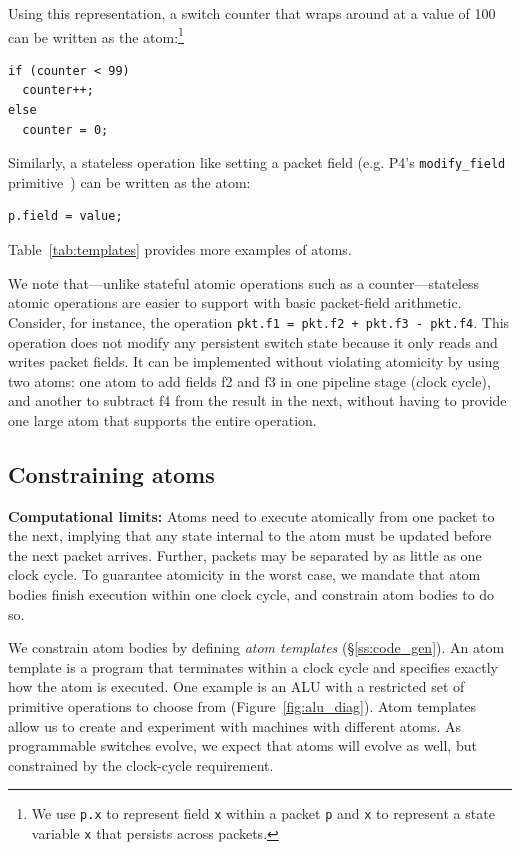 Using this representation, a switch counter that wraps around at a
value of 100 can be written as the atom:\footnote{We use {\tt p.x} to
  represent field {\tt x} within a packet {\tt p} and {\tt x} to
  represent a state variable {\tt x} that persists across packets.}
\begin{lstlisting}[style=customc, numbers=none, frame=none]
if (counter < 99)
  counter++;
else
  counter = 0;
\end{lstlisting}
Similarly, a stateless operation like setting a packet field
(e.g. P4's {\tt modify\_field} primitive~\cite{p4spec}) can be written
as the atom:
\begin{lstlisting}[style=customc, numbers=none, frame=none]
  p.field = value;
\end{lstlisting}
Table~\ref{tab:templates} provides more examples of atoms.

We note that---unlike stateful atomic operations such as a counter---stateless
atomic operations are easier to support with basic packet-field arithmetic.
Consider, for instance, the operation {\tt pkt.f1 = pkt.f2 + pkt.f3 - pkt.f4}.
This operation does not modify any persistent switch state because it only
reads and writes packet fields. It can be implemented without violating
atomicity by using two atoms: one atom to add fields f2 and f3 in one pipeline
stage (clock cycle), and another to subtract f4 from the result in the next,
without having to provide one large atom that supports the entire operation.


\subsection{Constraining atoms}
\label{s:atomConstraints}

\textbf{Computational limits:} Atoms need to execute atomically from one packet
to the next, implying that any state internal to the atom must be updated
before the next packet arrives. Further, packets may be separated by as little
as one clock cycle. To guarantee atomicity in the worst case, we mandate that
atom bodies finish execution within one clock cycle, and constrain atom bodies
to do so.

We constrain atom bodies by defining {\it atom templates}
(\S\ref{ss:code_gen}).  An atom template is a program that terminates within a
clock cycle and specifies exactly how the atom is executed. One example is an
ALU with a restricted set of primitive operations to choose from
(Figure~\ref{fig:alu_diag}). Atom templates allow us to create and experiment
with \absmachine machines with different atoms. As programmable switches
evolve, we expect that atoms will evolve as well, but constrained by the
clock-cycle requirement.

